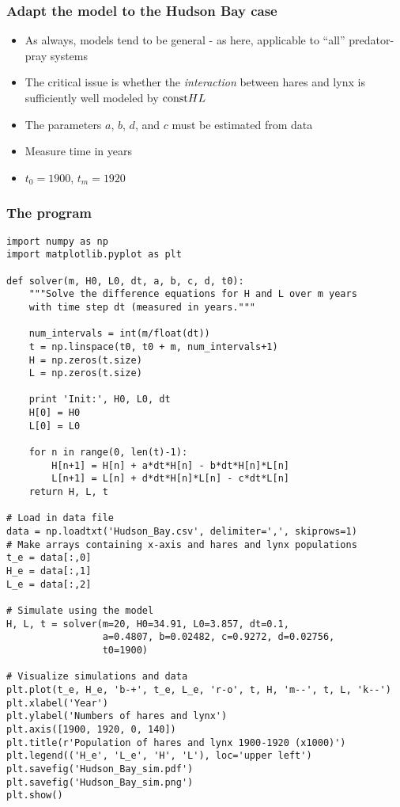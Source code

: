 \documentclass{beamer}
\begin{document}
\begin{frame}
\frametitle{Adapt the model to the Hudson Bay case}

\begin{block}{}
\begin{itemize}
 \item As always, models tend to be general - as here, applicable
   to ``all'' predator-pray systems

 \item The critical issue is whether the \emph{interaction} between hares and lynx
   is sufficiently well modeled by $\hbox{const}HL$

 \item The parameters $a$, $b$, $d$, and $c$ must be
   estimated from data

 \item Measure time in years

 \item $t_0=1900$, $t_m=1920$
\end{itemize}

\noindent
\end{block}
\end{frame}

\begin{frame}
\frametitle{The program}

\begin{block}{}
\begin{verbatim}
import numpy as np
import matplotlib.pyplot as plt

def solver(m, H0, L0, dt, a, b, c, d, t0):
    """Solve the difference equations for H and L over m years
    with time step dt (measured in years."""

    num_intervals = int(m/float(dt))
    t = np.linspace(t0, t0 + m, num_intervals+1)
    H = np.zeros(t.size)
    L = np.zeros(t.size)

    print 'Init:', H0, L0, dt
    H[0] = H0
    L[0] = L0

    for n in range(0, len(t)-1):
        H[n+1] = H[n] + a*dt*H[n] - b*dt*H[n]*L[n]
        L[n+1] = L[n] + d*dt*H[n]*L[n] - c*dt*L[n]
    return H, L, t

# Load in data file
data = np.loadtxt('Hudson_Bay.csv', delimiter=',', skiprows=1)
# Make arrays containing x-axis and hares and lynx populations
t_e = data[:,0]
H_e = data[:,1]
L_e = data[:,2]

# Simulate using the model
H, L, t = solver(m=20, H0=34.91, L0=3.857, dt=0.1,
                 a=0.4807, b=0.02482, c=0.9272, d=0.02756,
                 t0=1900)

# Visualize simulations and data
plt.plot(t_e, H_e, 'b-+', t_e, L_e, 'r-o', t, H, 'm--', t, L, 'k--')
plt.xlabel('Year')
plt.ylabel('Numbers of hares and lynx')
plt.axis([1900, 1920, 0, 140])
plt.title(r'Population of hares and lynx 1900-1920 (x1000)')
plt.legend(('H_e', 'L_e', 'H', 'L'), loc='upper left')
plt.savefig('Hudson_Bay_sim.pdf')
plt.savefig('Hudson_Bay_sim.png')
plt.show()
\end{verbatim}
\end{block}
\end{frame}
\end{document}
